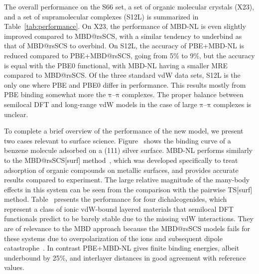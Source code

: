 The overall performance on the S66 set, a set of organic molecular crystals (X23), and a set of supramolecular complexes (S12L) is summarized in Table~\ref{tab:performance}.
On X23, the performance of MBD-NL is even slightly improved compared to MBD@rsSCS, with a similar tendency to underbind as that of MBD@rsSCS to overbind.
On S12L, the accuracy of PBE+MBD-NL is reduced compared to PBE+MBD@rsSCS, going from 5\% to 9\%, but the accuracy is equal with the PBE0 functional, with MBD-NL having a smaller MRE compared to MBD@rsSCS\@.
Of the three standard vdW data sets, S12L is the only one where PBE and PBE0 differ in performance.
This results mostly from PBE binding somewhat more the $\mathrm\pi$--$\mathrm\pi$ complexes.
The proper balance between semilocal DFT and long-range vdW models in the case of large $\mathrm\pi$--$\mathrm\pi$ complexes is unclear.

To complete a brief overview of the performance of the new model, we present two cases relevant to surface science.
Figure~\label{fig:silver-benzene} shows the binding curve of a benzene molecule adsorbed on a (111) silver surface.
MBD-NL performs similarly to the MBD@rsSCS[surf] method~\citep{RuizPRB16}, which was developed specifically to treat adsorption of organic compounds on metallic surfaces, and provides accurate results compared to experiment.
The large relative magnitude of the many-body effects in this system can be seen from the comparison with the pairwise TS[surf] method.
Table~\label{tab:dichalcogenides} presents the performance for four dichalcogenides, which represent a class of ionic vdW-bound layered materials that semilocal DFT functionals predict to be barely stable due to the missing vdW interactions.
They are of relevance to the MBD approach because the MBD@rsSCS models fails for these systems due to overpolarization of the ions and subsequent dipole catastrophe~\citep{GouldJCTC16a}.
In contrast PBE+MBD-NL gives finite binding energies, albeit underbound by 25\%, and interlayer distances in good agreement with reference values.

